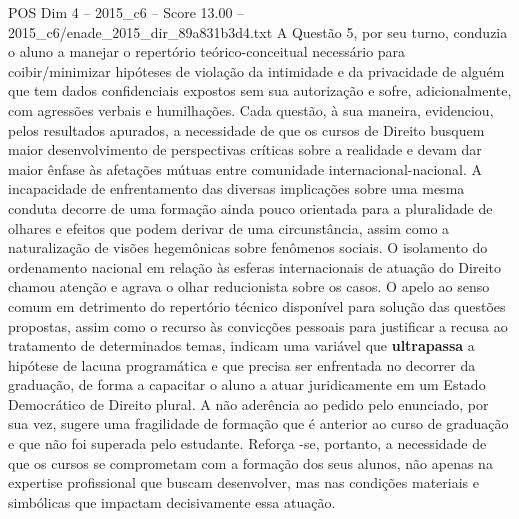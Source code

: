 \begin{textsample}{POS Dim 4 – 2015\_c6 – Score 13.00 – 2015\_c6/enade\_2015\_dir\_89a831b3d4.txt}
A Questão 5, por seu turno, conduzia o aluno a manejar o repertório teórico-conceitual necessário para coibir/minimizar hipóteses de violação da intimidade e da privacidade de alguém que tem dados confidenciais expostos sem sua autorização e sofre, adicionalmente, com agressões verbais e humilhações.
Cada questão, à sua maneira, evidenciou, pelos resultados apurados, a necessidade de que os cursos de Direito busquem maior desenvolvimento de perspectivas críticas sobre a realidade e devam dar maior ênfase às afetações mútuas entre comunidade internacional-nacional.
A incapacidade de enfrentamento das diversas implicações sobre uma mesma conduta decorre de uma formação ainda pouco orientada para a pluralidade de olhares e efeitos que podem derivar de uma circunstância, assim como a naturalização de visões hegemônicas sobre fenômenos sociais.
O isolamento do ordenamento nacional em relação às esferas internacionais de atuação do Direito chamou atenção e agrava o olhar reducionista sobre os casos.
O apelo ao senso comum em detrimento do repertório técnico disponível para solução das questões propostas, assim como o recurso às convicções pessoais para justificar a recusa ao tratamento de determinados temas, indicam uma variável que \textbf{ultrapassa} a hipótese de lacuna programática e que precisa ser enfrentada no decorrer da graduação, de forma a capacitar o aluno a atuar juridicamente em um Estado Democrático de Direito plural.
A não aderência ao pedido pelo enunciado, por sua vez, sugere uma fragilidade de formação que é anterior ao curso de graduação e que não foi superada pelo estudante.
Reforça -se, portanto, a necessidade de que os cursos se comprometam com a formação dos seus alunos, não apenas na expertise profissional que buscam desenvolver, mas nas condições materiais e simbólicas que impactam decisivamente essa atuação.

\end{textsample}
